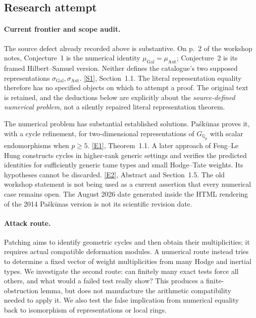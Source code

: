 \documentclass[11pt,a4paper]{article}
\newcommand{\Q}{\mathbb{Q}}
\newcommand{\sref}[2]{\hyperlink{source:#1:#2}{[S#2]}}
\newcommand{\eref}[2]{\hyperlink{extra:#1:#2}{[E#2]}}
\numberwithin{equation}{section}
\begin{document}
\subsection{Research attempt}

\paragraph{Current frontier and scope audit.}
The source defect already recorded above is substantive. On p.~2 of the
workshop notes, Conjecture~1 is the numerical identity
$\mu_{\mathrm{Gal}}=\mu_{\mathrm{Aut}}$; Conjecture~2 is its framed
Hilbert--Samuel version. Neither defines the catalogue's two supposed
representations $\sigma_{\mathrm{Gal}},\sigma_{\mathrm{Aut}}$.
\sref{statement}{1}, Section~1.1. The literal representation equality therefore
has no specified objects on which to attempt a proof. The original text
is retained, and the deductions below are explicitly about the
\emph{source-defined numerical problem}, not a silently repaired literal
representation theorem.

The numerical problem has substantial established solutions. Pa\v{s}k\=unas
proves it, with a cycle refinement, for two-dimensional representations
of $G_{\Q_p}$ with scalar endomorphisms when $p\ge5$.
\eref{statement}{1}, Theorem~1.1. A later approach of Feng--Le Hung constructs
cycles in higher-rank generic settings and verifies the predicted
identities for sufficiently generic tame types and small Hodge--Tate
weights. Its hypotheses cannot be discarded. \eref{statement}{2}, Abstract
and Section~1.5. The old workshop statement is not being used as a
current assertion that every numerical case remains open. The August
2026 date generated inside the HTML rendering of the 2014 Pa\v{s}k\=unas
version is not its scientific revision date.

\paragraph{Attack route.}
Patching aims to identify geometric cycles and then obtain their
multiplicities; it requires actual compatible deformation modules.
A numerical route instead tries to determine a fixed vector of weight
multiplicities from many Hodge and inertial types. We investigate the
second route: can finitely many exact tests force all others, and what
would a failed test really show? This produces a finite-obstruction
lemma, but does not manufacture the arithmetic compatibility needed to
apply it. We also test the false implication from numerical equality
back to isomorphism of representations or local rings.
\end{document}
